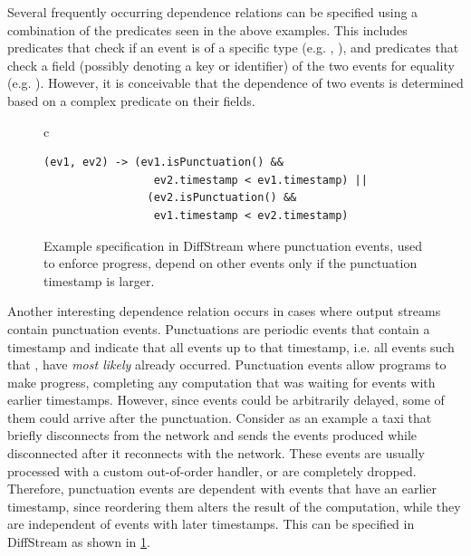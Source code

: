 Several frequently occurring dependence relations can be specified
using a combination of the predicates seen in the above examples. This
includes predicates that check if an event is of a specific type
(e.g. , ), and predicates that
check a field (possibly denoting a key or identifier) of the two
events for equality (e.g. ). However, it is conceivable that the dependence of two
events is determined based on a complex predicate on their fields.

\begin{figure}[t]
  \centering \footnotesize{}
\begin{tabular}{c}
\begin{lstlisting}[basicstyle=\ttfamily\small,linewidth=10cm]
  (ev1, ev2) -> (ev1.isPunctuation() &&
                 ev2.timestamp < ev1.timestamp) ||
                (ev2.isPunctuation() &&
                 ev1.timestamp < ev2.timestamp)
\end{lstlisting}
\end{tabular}
  \caption{Example specification in DiffStream where punctuation events, used to enforce progress, depend on other events only if the punctuation timestamp is larger.}
  \label{diffstream:fig:punctuation-example-dependencies}
\end{figure}

Another interesting dependence relation occurs in cases where output streams contain punctuation events.
Punctuations are periodic events that contain a timestamp and indicate
that all events up to that timestamp, i.e. all events  such that , have \emph{most likely} already occurred.
Punctuation events allow programs to make progress, completing any
computation that was waiting for events with earlier
timestamps. However, since events could be arbitrarily delayed, some
of them could arrive after the punctuation.
Consider as an example a taxi that briefly
disconnects from the network and sends the events produced while disconnected
after it reconnects with the network. These events are usually
processed with a custom out-of-order handler, or are completely
dropped. Therefore, punctuation events are dependent with events
that have an earlier timestamp, since reordering them alters the result of the computation, while they are independent of events with later timestamps. This can be specified in DiffStream as
shown in \cref{diffstream:fig:punctuation-example-dependencies}.


